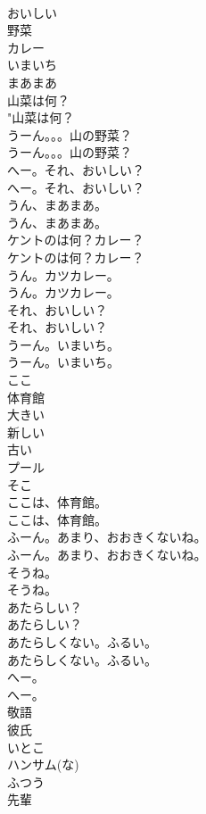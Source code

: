 \documentclass[8pt]{extreport}
\begin{document}
\begin{CJK}{UTF8}{min}
\\	おいしい
\\	野菜
\\	カレー
\\	いまいち
\\	まあまあ
\\	山菜は何？	
\\	"山菜は何？ 
\\	うーん。。。山の野菜？	
\\	うーん。。。山の野菜？ 
\\	へー。それ、おいしい？	
\\	へー。それ、おいしい？ 
\\	うん、まあまあ。	
\\	うん、まあまあ。 
\\	ケントのは何？カレー？	
\\	ケントのは何？カレー？ 
\\	うん。カツカレー。	
\\	うん。カツカレー。 
\\	それ、おいしい？	
\\	それ、おいしい？ 
\\	うーん。いまいち。	
\\	うーん。いまいち。 
\\	ここ
\\	体育館
\\	大きい
\\	新しい
\\	古い
\\	プール
\\	そこ
\\	ここは、体育館。	
\\	ここは、体育館。 
\\	ふーん。あまり、おおきくないね。	
\\	ふーん。あまり、おおきくないね。 
\\	そうね。	
\\	そうね。 
\\	あたらしい？	
\\	あたらしい？ 
\\	あたらしくない。ふるい。	
\\	あたらしくない。ふるい。 
\\	へー。	
\\	へー。 
\\	敬語
\\	彼氏
\\	いとこ
\\	ハンサム(な)
\\	ふつう
\\	先輩

\end{CJK}
\end{document}
